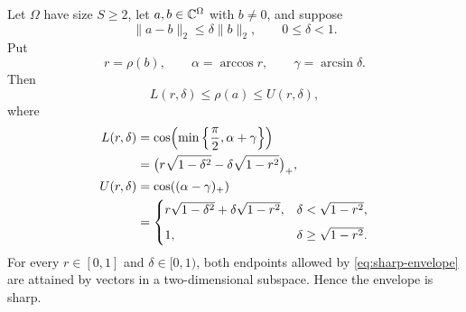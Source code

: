 \begin{theorem}
\label{thm:sharp-envelope}
Let \(\Omega\) have size \(S\ge2\), let \(a,b\in\mathbb C^\Omega\) with
\(b\ne0\), and suppose
\begin{equation}
 \|a-b\|_2\le\delta\|b\|_2,\qquad 0\le\delta<1.
\label{eq:relative-error-hyp}
\end{equation}
Put
\[
 r=\rho(b),\qquad
 \alpha=\arccos r,\qquad
 \gamma=\arcsin\delta.
\]
Then
\begin{equation}
 \boxed{
 L(r,\delta)\le\rho(a)\le U(r,\delta),}
\label{eq:sharp-envelope}
\end{equation}
where
\begin{align}
 L(r,\delta)
 &=
 \cos\!\left(
 \min\left\{\frac{\pi}{2},\alpha+\gamma\right\}\right)
 \notag\\
 &=
 \bigl(
 r\sqrt{1-\delta^2}
 -\delta\sqrt{1-r^2}
 \bigr)_+,
\label{eq:L-envelope}\\
 U(r,\delta)
 &=
 \cos\!\left((\alpha-\gamma)_+\right)
\notag\\
 &=
 \begin{cases}
 r\sqrt{1-\delta^2}
 +\delta\sqrt{1-r^2},
 &\delta<\sqrt{1-r^2},\\[2mm]
 1,&\delta\ge\sqrt{1-r^2}.
 \end{cases}
\label{eq:U-envelope}
\end{align}
For every \(r\in[0,1]\) and \(\delta\in[0,1)\), both endpoints
allowed by \eqref{eq:sharp-envelope} are attained by vectors in a
two-dimensional subspace.  Hence the envelope is sharp.
\end{theorem}

